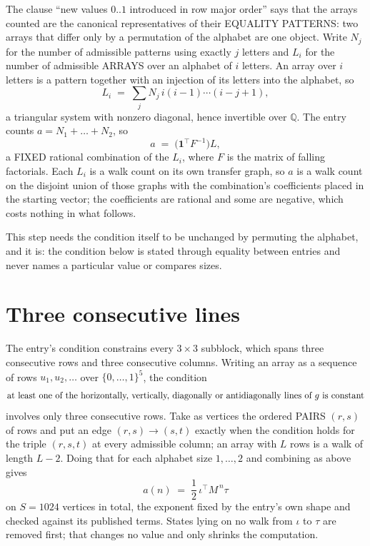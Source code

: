 \documentclass[11pt,a4paper]{article}
\theoremstyle{plain}
\theoremstyle{definition}
\begin{document}
The clause ``new values $0..1$ introduced in row major order'' says that the arrays
counted are the canonical representatives of their EQUALITY PATTERNS: two arrays that differ
only by a permutation of the alphabet are one object. Write $N_j$ for the number of admissible
patterns using exactly $j$ letters and $L_i$ for the number of admissible ARRAYS over an
alphabet of $i$ letters. An array over $i$ letters is a pattern together with an injection of
its letters into the alphabet, so
\[
L_i\;=\;\sum_{j}N_j\,i(i-1)\cdots(i-j+1),
\]
a triangular system with nonzero diagonal, hence invertible over $\mathbb{Q}$. The entry
counts $a=N_1+\dots+N_{2}$, so
\[
a\;=\;\bigl(\mathbf{1}^{\!\top}F^{-1}\bigr)L ,
\]
a FIXED rational combination of the $L_i$, where $F$ is the matrix of falling factorials.
Each $L_i$ is a walk count on its own transfer graph, so $a$ is a walk count on the disjoint
union of those graphs with the combination's coefficients placed in the starting vector; the
coefficients are rational and some are negative, which costs nothing in what follows.

This step needs the condition itself to be unchanged by permuting the alphabet, and it is:
the condition below is stated through equality between entries and never names a particular
value or compares sizes.

\section{Three consecutive lines}

The entry's condition constrains every $3\times3$ subblock, which spans three consecutive
rows and three consecutive columns. Writing an array as a sequence of rows
$u_1,u_2,\dots$ over $\{0,\dots,1\}^{5}$, the condition
\[
\text{at least one}\text{ of the horizontally, vertically, diagonally or antidiagonally lines of }g\text{ \text{is constant}}
\]
involves only three consecutive rows. Take as vertices the ordered PAIRS $(r,s)$ of
rows and put an edge $(r,s)\to(s,t)$ exactly when the condition holds for the triple
$(r,s,t)$ at every admissible column; an array with $L$ rows is a walk of length $L-2$.
Doing that for each alphabet size $1,\dots,2$ and combining as above gives
\[
a(n)\;=\;\frac{1}{2}\,\iota^{\!\top}M^{\,n}\tau
\]
on $S=1024$ vertices in total, the exponent fixed by the entry's own shape and checked against
its published terms. States lying on no walk from $\iota$ to $\tau$ are removed first; that
changes no value and only shrinks the computation.
\end{document}
